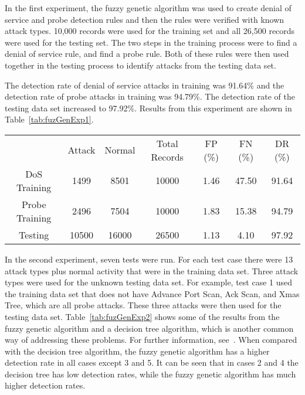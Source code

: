 \documentclass{sig-alternate}
\begin{document}
In the first experiment, the fuzzy genetic algorithm was used to create denial of service and probe detection rules and then the rules were verified with known attack types. 10,000 records were used for the training set and all 26,500 records were used for the testing set. The two steps in the training process were to find a denial of service rule, and find a probe rule. Both of these rules were then used together in the testing process to identify attacks from the testing data set.

The detection rate of denial of service attacks in training was 91.64\% and the detection rate of probe attacks in training was 94.79\%. The detection rate of the testing data set increased to 97.92\%. Results from this experiment are shown in Table~\ref{tab:fuzGenExp1}.

\begin{table*}
\center
\caption{Results from Experiment 1}
\begin{tabular}{ccccccc}
 & Attack & Normal & Total Records & FP (\%) & FN (\%) & DR (\%)\\
DoS Training & 1499 & 8501 & 10000 & 1.46 & 47.50 & 91.64\\
Probe Training & 2496 & 7504 & 10000 & 1.83 & 15.38 & 94.79\\
Testing & 10500 & 16000 & 26500 & 1.13 & 4.10 & 97.92\\
\end{tabular}
\label{tab:fuzGenExp1}
\center
\end{table*}

In the second experiment, seven tests were run. For each test case there were 13 attack types plus normal activity that were in the training data set. Three attack types were used for the unknown testing data set. For example, test case 1 used the training data set that does not have Advance Port Scan, Ack Scan, and Xmas Tree, which are all probe attacks. These three attacks were then used for the testing data set. Table~\ref{tab:fuzGenExp2} shows some of the results from the fuzzy genetic algorithm and a decision tree algorithm, which is another common way of addressing these problems. For further information, see~\cite{decisionTree}. When compared with the decision tree algorithm, the fuzzy genetic algorithm has a higher detection rate in all cases except 3 and 5. It can be seen that in cases 2 and 4 the decision tree has low detection rates, while the fuzzy genetic algorithm has much higher detection rates.
\end{document}
